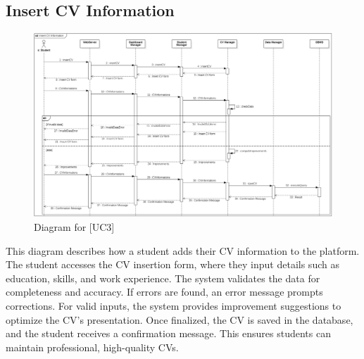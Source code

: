 \subsection{Insert CV Information}
\begin{figure} [H]
    \centering
    \includegraphics[width=1\linewidth]{DD/Images/Runtime Sequence Diagram Images/insert_cv_information.png}
    \caption{Diagram for [UC3]}
    \label{fig: Insert CV Information Diagram}
\end{figure}
This diagram describes how a student adds their CV information to the platform. The student accesses the CV insertion form, where they input details such as education, skills, and work experience. The system validates the data for completeness and accuracy. If errors are found, an error message prompts corrections. For valid inputs, the system provides improvement suggestions to optimize the CV’s presentation. Once finalized, the CV is saved in the database, and the student receives a confirmation message. This ensures students can maintain professional, high-quality CVs.

